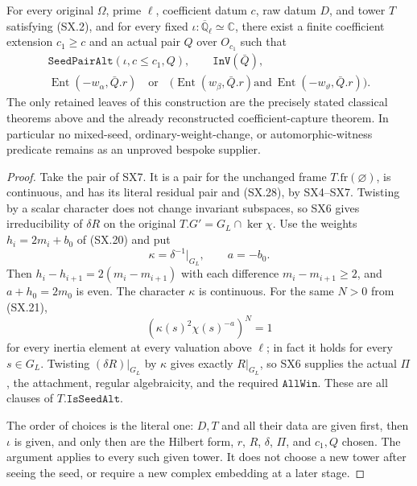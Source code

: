 \begin{theorem}
\label{claim:SX8}
For every original $\Omega$, prime $\ell$, coefficient datum
$c$, raw datum $D$, and tower $T$ satisfying (SX.2), and for
every fixed $\iota:\overline{\mathbb Q}_\ell\simeq\mathbb C$,
there exist a finite coefficient extension $c_1\ge c$ and an
actual pair $Q$ over $O_{c_1}$ such that
\[
 \begin{gathered}
 \texttt{SeedPairAlt}(\iota,c\le c_1,Q),\qquad
 \texttt{InV}(\bar Q),\\
 \operatorname{Ent}(-w_\alpha,\bar Q.r)\quad\text{or}\quad
 \bigl(\operatorname{Ent}(w_\beta,\bar Q.r) 
       \text{and}\ \operatorname{Ent}(-w_\vartheta,\bar Q.r)\bigr).
 \end{gathered}                                                \tag{SX.28}
\]
The only retained leaves of this construction are the precisely
stated classical theorems above and the already reconstructed
coefficient-capture theorem.  In particular no mixed-seed,
ordinary-weight-change, or automorphic-witness predicate remains
as an unproved bespoke supplier.
\end{theorem}
\begin{proof}
Take the pair of SX7.  It is a pair for the unchanged frame
$T.\mathrm{fr}(\varnothing)$, is continuous, and has its
literal residual pair and (SX.28), by SX4--SX7.
Twisting by a scalar character does not change invariant
subspaces, so SX6 gives irreducibility of $\delta R$ on
the original $T.G'=G_L\cap\ker\chi$.
Use the weights $h_i=2m_i+b_0$ of (SX.20) and put
\[
          \kappa=\delta^{-1}|_{G_L},\qquad a=-b_0.
                                                            \tag{SX.29}
\]
Then $h_i-h_{i+1}=2(m_i-m_{i+1})$ with each difference
$m_i-m_{i+1}\ge2$, and $a+h_0=2m_0$ is even.
The character $\kappa$ is continuous.  For the same $N>0$
from (SX.21),
\[
       (\kappa(s)^2\chi(s)^{-a})^N=1
\]
for every inertia element at every valuation above $\ell$;
in fact it holds for every $s\in G_L$.
Twisting $(\delta R)|_{G_L}$ by $\kappa$ gives exactly
$R|_{G_L}$, so SX6 supplies the actual $\Pi$, the attachment,
regular algebraicity, and the required $\texttt{AllWin}$.
These are all clauses of $T.\texttt{IsSeedAlt}$.

The order of choices is the literal one: $D,T$ and all their
data are given first, then $\iota$ is given, and only then are
the Hilbert form, $r$, $R$, $\delta$, $\Pi$, and $c_1,Q$
chosen.  The argument applies to every such given tower.
It does not choose a new tower after seeing the seed, or
require a new complex embedding at a later stage.
\end{proof}

